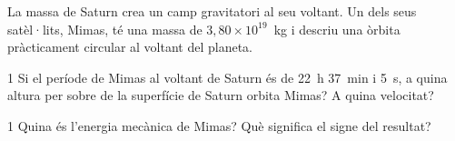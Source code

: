 La massa de Saturn crea un camp gravitatori al seu voltant. Un dels seus satèl·lits, Mimas, té una massa de $3,80\times 10^{19}$~kg i descriu una òrbita pràcticament circular al voltant del planeta.


\begin{apartat}{1}
Si el període de Mimas al voltant de Saturn és de 22~h 37~min i 5~s, a quina altura per sobre de la superfície de Saturn orbita Mimas? A quina velocitat?
\end{apartat}

\begin{apartat}{1}
Quina és l'energia mecànica de Mimas? Què significa el signe del resultat?
\end{apartat}

